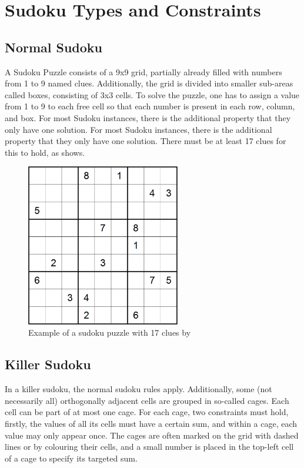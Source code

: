\chapter{Sudoku Types and Constraints}
\section{Normal Sudoku}
A Sudoku Puzzle consists of a 9x9 grid, partially already filled with numbers from 1 to 9 named clues. Additionally, the grid is divided into smaller sub-areas called boxes, consisting of  3x3 cells. To solve the puzzle, one has to assign a value from 1 to 9 to each free cell so that each number is present in each row, column, and box.
For most Sudoku instances, there is the additional property that they only have one solution. For most Sudoku instances, there is the additional property that they only have one solution. There must be at least 17 clues for this to hold, as \citet{https://doi.org/10.48550/arxiv.1201.0749} shows.

\begin{figure}
\centering
\includegraphics[width=0.6\textwidth]{Figures/17-clue sudoku puzzle (McGuire).png}
\caption{Example of a sudoku puzzle with 17 clues by \citet{https://doi.org/10.48550/arxiv.1201.0749}}
\label{fig:machine}
\end{figure}

\section{Killer Sudoku}
In a killer sudoku, the normal sudoku rules apply. Additionally, some (not necessarily all) orthogonally adjacent cells are grouped in so-called cages. Each cell can be part of at most one cage. For each cage, two constraints must hold, firstly, the values of all its cells must have a certain sum, and within a cage, each value may only appear once. The cages are often marked on the grid with dashed lines or by colouring their cells, and a small number is placed in the top-left cell of a cage to specify its targeted sum.

